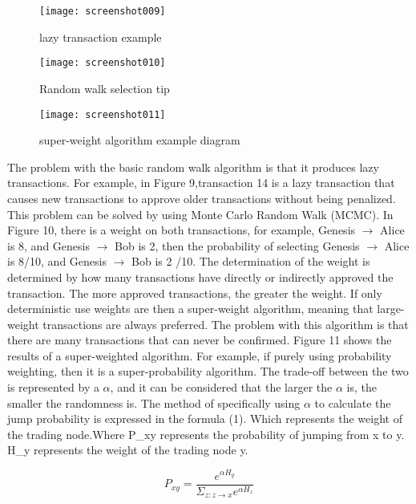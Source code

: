 \documentclass{article}
\begin{document}
\begin{figure}[H]
	\centering
	\texttt{[image: screenshot009]}
	\caption{lazy transaction example}
	\label{simulationfigure}
\end{figure}

\begin{figure}[H]
	\centering
	\texttt{[image: screenshot010]}
	\caption{Random walk selection tip}
	\label{simulationfigure}
\end{figure}

\begin{figure}[H]
	\centering
	\texttt{[image: screenshot011]}
	\caption{super-weight algorithm example diagram}
	\label{simulationfigure}
\end{figure}

The problem with the basic random walk algorithm is that it produces lazy transactions. For example, in Figure 9,transaction 14 is a lazy transaction that causes new transactions to approve older transactions without being penalized. This problem can be solved by using Monte Carlo Random Walk (MCMC). In Figure 10, there is a weight on both transactions, for example, Genesis $\rightarrow$ Alice is 8, and Genesis $\rightarrow$ Bob is 2, then the probability of selecting Genesis $\rightarrow$ Alice is 8/10, and Genesis $\rightarrow$ Bob is 2 /10. The determination of the weight is determined by how many transactions have directly or indirectly approved the transaction. The more approved transactions, the greater the weight. If only deterministic use weights are then a super-weight algorithm, meaning that large-weight transactions are always preferred. The problem with this algorithm is that there are many transactions that can never be confirmed. Figure 11 shows the results of a super-weighted algorithm. For example, if purely using probability weighting, then it is a
super-probability algorithm. The trade-off between the two is represented by a $\alpha$, and it can be considered that the
larger the $\alpha$ is, the smaller the randomness is. The method of specifically using $\alpha$ to calculate the jump probability is expressed in the formula (1). Which represents the weight of the trading node.Where P\_{xy} represents the probability of jumping from x to y. H\_{y} represents the weight of the trading node y.

\begin{equation}
\label{simple_equation}
P_{xy} = \frac{e^{\alpha H_{y}}}{\Sigma_{z:z \rightarrow x}e^{\alpha H_{z}}}
\end{equation}
\end{document}
